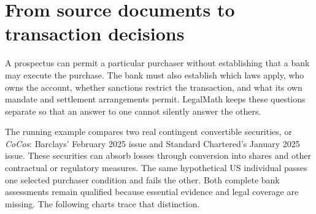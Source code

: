 \documentclass[12pt,a4paper,oneside,openany]{book}
\begin{document}
\chapter*{From source documents to transaction decisions}
\label{map:overview}
\begingroup
{}
\newcommand{\MapSubheading}[1]{\par\vspace{2mm}{\sffamily\bfseries\large #1\par}\vspace{1mm}}
\newcommand{\MapHeading}[2]{\phantomsection\label{#2}\MapSubheading{#1}}
\newenvironment{MapDiagram}{\par\noindent\begin{minipage}{\linewidth}\centering}{\par\end{minipage}\par}
\newcommand{\MapCaption}[1]{\par{\small\itshape #1\par}\vspace{2mm}}

A prospectus can permit a particular purchaser without establishing that a
bank may execute the purchase. The bank must also establish which laws apply,
who owns the account, whether sanctions restrict the transaction, and what its
own mandate and settlement arrangements permit. LegalMath keeps these questions
separate so that an answer to one cannot silently answer the others.

The running example compares two real contingent convertible securities, or
\emph{CoCos}: Barclays' February 2025 issue and Standard Chartered's January
2025 issue. These securities can absorb losses through conversion into shares
and other contractual or regulatory measures. The same hypothetical US
individual passes one selected purchaser condition and fails the other. Both
complete bank assessments remain qualified because essential evidence and
legal coverage are missing. The following charts trace that distinction.
\end{document}
